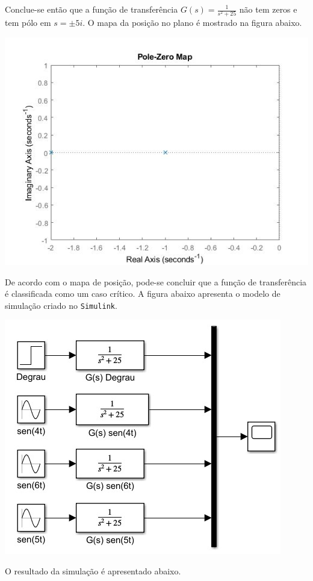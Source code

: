 \documentclass[
]{book}
\begin{document}
Conclue-se então que a função de transferência \(G(s) = \frac {1}{s^2 +25}\) não tem zeros e tem pólo em \(s = \pm 5i\). O mapa da posição no plano é mostrado na figura abaixo.

\includegraphics{Imagens/Lab2/prob3.jpg}

De acordo com o mapa de posição, pode-se concluir que a função de transferência é classificada como um caso crítico. A figura abaixo apresenta o modelo de simulação criado no \texttt{Simulink}.

\includegraphics{Imagens/Lab2/modelSim3.jpg}

O resultado da simulação é apresentado abaixo.
\end{document}
